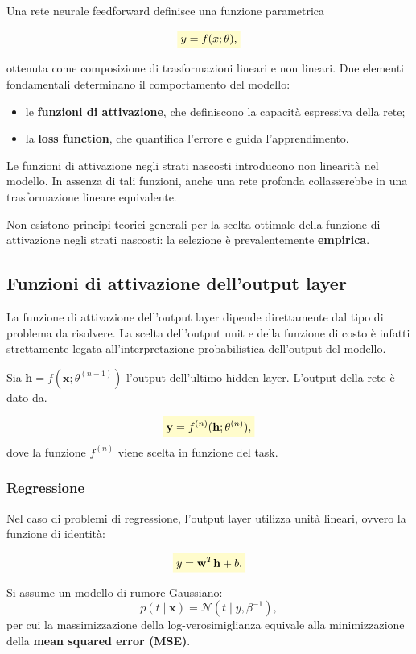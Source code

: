 \documentclass[a4paper,12pt]{report}
\newcommand{\highlight}[1]{%
\colorbox{yellow!20}{$\displaystyle #1$}%
}
\begin{document}
Una rete neurale feedforward definisce una funzione parametrica

\[
\highlight{
y = f(x;\theta),}
\]

ottenuta come composizione di trasformazioni lineari e non lineari.  
Due elementi fondamentali determinano il comportamento del modello:

\begin{itemize}
    \item le \textbf{funzioni di attivazione}, che definiscono la capacità espressiva della rete;
    \item la \textbf{loss function}, che quantifica l’errore e guida l’apprendimento.
\end{itemize}

Le funzioni di attivazione negli strati nascosti introducono non linearità nel modello.  
In assenza di tali funzioni, anche una rete profonda collasserebbe in una trasformazione lineare equivalente.

Non esistono principi teorici generali per la scelta ottimale della funzione di attivazione negli strati nascosti: la selezione è prevalentemente \textbf{empirica}.


\subsection{Funzioni di attivazione dell’output layer}

La funzione di attivazione dell’output layer dipende direttamente dal tipo di problema da risolvere.  
La scelta dell’output unit e della funzione di costo è infatti strettamente legata all’interpretazione probabilistica dell’output del modello.

Sia $\mathbf{h} = f(\mathbf{x}; \theta^{(n-1)})$ l’output dell’ultimo hidden layer.  
L’output della rete è dato da.

\[
\highlight{
\mathbf{y} = f^{(n)}(\mathbf{h}; \theta^{(n)}),}
\]
dove la funzione $f^{(n)}$ viene scelta in funzione del task.

\subsubsection{Regressione}

Nel caso di problemi di regressione, l’output layer utilizza unità lineari, ovvero la funzione di identità:

\[
\highlight{
y = \mathbf{w}^T \mathbf{h} + b.}
\]

Si assume un modello di rumore Gaussiano:
\[
p(t \mid \mathbf{x}) = \mathcal{N}(t \mid y, \beta^{-1}),
\]
per cui la massimizzazione della log-verosimiglianza equivale alla minimizzazione della \textbf{mean squared error (MSE)}.
\end{document}
